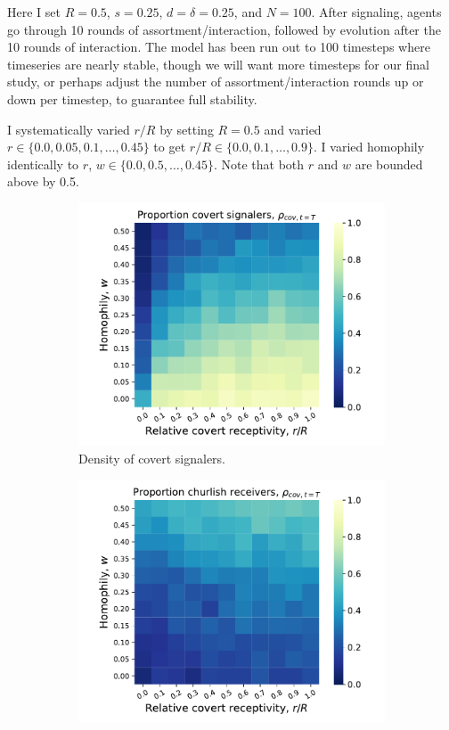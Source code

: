 \documentclass[11pt,letterpaper]{article}
\begin{document}
Here I set $R=0.5$, $s=0.25$, $d=\delta=0.25$,
and $N=100$. After signaling, agents go through 10 rounds of assortment/interaction,
followed by evolution after the 10 rounds of interaction. The model has been
run out to 100 timesteps where timeseries are nearly stable, though we will
want more timesteps for our final study, or perhaps adjust the number of 
assortment/interaction rounds up or down per timestep, to guarantee full 
stability.

I systematically varied $r/R$ by setting $R=0.5$ and varied 
$r \in \{0.0, 0.05, 0.1, \ldots, 0.45\}$ to get $r/R \in \{0.0, 0.1, \ldots, 0.9\}$.
I varied homophily identically to $r$, $w \in \{0.0, 0.5, \ldots, 0.45\}$. Note
that both $r$ and $w$ are bounded above by 0.5.

\begin{figure}[H]
  \centering
  \begin{subfigure}{0.49\textwidth}
    \centering
    \includegraphics[width=\textwidth]{Figures/basic_receptivity_signaling.pdf}
    \caption{Density of covert signalers.}
  \end{subfigure}
  \begin{subfigure}{0.49\textwidth}
    \centering
    \includegraphics[width=\textwidth]{Figures/basic_receptivity_receiving.pdf}

\end{subfigure}
\end{figure}
\end{document}

